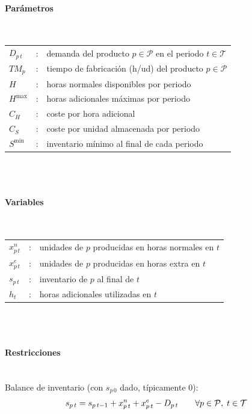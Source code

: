 \paragraph{Parámetros}\mbox{}\\
\begin{tabular}{l c l}
    $D_{p\,t}$   & : & demanda del producto $p \in \mathcal{P}$ en el periodo $t \in \mathcal{T}$ \\
    $TM_p$       & : & tiempo de fabricación (h/ud) del producto $p \in \mathcal{P}$ \\
    $H$          & : & horas normales disponibles por periodo \\
    $H^{\max}$   & : & horas adicionales máximas por periodo \\
    $C_H$        & : & coste por hora adicional \\
    $C_S$        & : & coste por unidad almacenada por periodo \\
    $S^{\min}$   & : & inventario mínimo al final de cada periodo \\
\end{tabular}
\\
\\

\paragraph{Variables}\mbox{}\\
\begin{tabular}{l c l}
    $x^{n}_{p\,t}$ & : & unidades de $p$ producidas en horas normales en $t$ \\
    $x^{e}_{p\,t}$ & : & unidades de $p$ producidas en horas extra en $t$ \\
    $s_{p\,t}$     & : & inventario de $p$ al final de $t$ \\
    $h_t$          & : & horas adicionales utilizadas en $t$ \\
\end{tabular}
\\
\\

\paragraph{Restricciones}\mbox{}\\
Balance de inventario (con $s_{p\,0}$ dado, típicamente $0$):
\begin{align}
s_{p\,t} = s_{p\,t-1} + x^{n}_{p\,t} + x^{e}_{p\,t} - D_{p\,t}
\qquad \forall p \in \mathcal{P},\; t \in \mathcal{T} \notag
\end{align}

